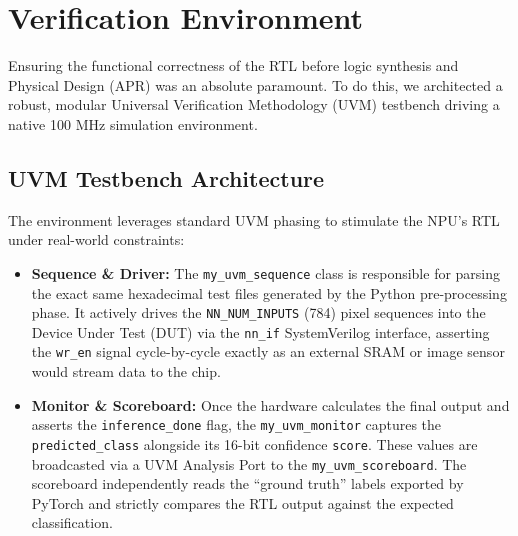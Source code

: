 \section{Verification Environment}
\label{sec:verification}

Ensuring the functional correctness of the RTL before logic synthesis and Physical Design (APR) was an absolute paramount. To do this, we architected a robust, modular Universal Verification Methodology (UVM) testbench driving a native 100 MHz simulation environment.

\subsection{UVM Testbench Architecture}
The environment leverages standard UVM phasing to stimulate the NPU's RTL under real-world constraints:
\begin{itemize}
    \item \textbf{Sequence \& Driver:} The \texttt{my\_uvm\_sequence} class is responsible for parsing the exact same hexadecimal test files generated by the Python pre-processing phase. It actively drives the \texttt{NN\_NUM\_INPUTS} (784) pixel sequences into the Device Under Test (DUT) via the \texttt{nn\_if} SystemVerilog interface, asserting the \texttt{wr\_en} signal cycle-by-cycle exactly as an external SRAM or image sensor would stream data to the chip.
    \item \textbf{Monitor \& Scoreboard:} Once the hardware calculates the final output and asserts the \texttt{inference\_done} flag, the \texttt{my\_uvm\_monitor} captures the \texttt{predicted\_class} alongside its 16-bit confidence \texttt{score}. These values are broadcasted via a UVM Analysis Port to the \texttt{my\_uvm\_scoreboard}. The scoreboard independently reads the ``ground truth'' labels exported by PyTorch and strictly compares the RTL output against the expected classification.
\end{itemize}

